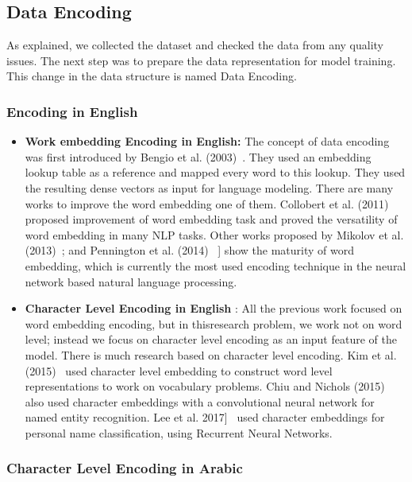 \subsection{Data Encoding}\label{Ch:Data_Encoding}

As explained, we collected the dataset and checked the data from any quality issues. The next step was to prepare the data representation for model training. This change in the data structure is named Data Encoding.

\subsubsection{Encoding in English}

\begin{itemize}
 \item \textbf{Work embedding Encoding in English:} The concept of data encoding was first introduced by Bengio et al. (2003)~\cite{Bengio2003}. They used an embedding lookup table as a reference and mapped every word to this lookup. They used the resulting dense vectors as input for language modeling. There are many works to improve the word embedding one of them. Collobert et al. (2011)~\cite{Collobert_2011} proposed improvement of word embedding task and proved the versatility of word embedding in many NLP tasks. Other works proposed by Mikolov et al. (2013)~\cite{Mikolov_2013}; and Pennington et al. (2014)~\cite{Pennington_2014} ] show the maturity of word embedding, which is currently the most used encoding technique in the neural network based natural language processing.

 \item \textbf{Character Level Encoding in English} : All the previous work focused on word embedding encoding, but in thisresearch problem, we work not on word level; instead we focus on character level encoding as an input feature of the model. There is much research based on character level encoding. Kim et al. (2015)~\cite{Kim_2015} used character level embedding to construct word level representations to work on vocabulary problems. Chiu and Nichols (2015)~\cite{Chiu_2015} also used character embeddings with a convolutional neural network for named entity recognition. Lee et al. 2017]~\cite{ijcai_2017} used character embeddings for personal name classification, using Recurrent Neural Networks.

\end{itemize}

\subsubsection{Character Level Encoding in Arabic}\label{sec:Char_Level_Arabic}

